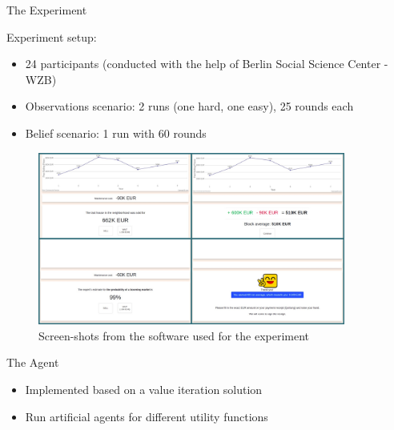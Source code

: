 
\begin{block}{The Experiment}

Experiment setup: 

\begin{itemize}
    \item 24 participants (conducted with the help of Berlin Social Science Center - WZB)
    \item Observations scenario: 2 runs (one hard, one easy), 25 rounds each
    \item Belief scenario: 1 run with 60 rounds
\end{itemize}

\begin{figure}
  \centering
    \includegraphics[width=0.9\textwidth]{img/methods/pjimage.jpg}
  \caption{Screen-shots from the software used for the experiment}
  
\end{figure}

\end{block}


\begin{block}{The Agent}

\begin{itemize}
    \item Implemented based on a value iteration solution
    \item Run artificial agents for different utility functions
\end{itemize}

\end{block}

